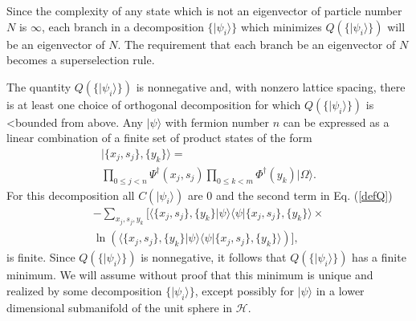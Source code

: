 \documentclass[twocolumn,amsmath,amssymb]{revtex4-1}
\begin{document}
Since the complexity of any state which is not an eigenvector of particle number $N$
is $\infty$, each branch in a decomposition $\{|\psi_i \rangle \}$ which minimizes
$Q( \{|\psi_i \rangle \})$ will be an eigenvector of $N$.
The requirement that each branch be an eigenvector of $N$
becomes a superselection rule.


The quantity $Q( \{|\psi_i \rangle \})$ is nonnegative and, with
nonzero lattice spacing, there is at least
one choice of orthogonal decomposition for which
$Q( \{|\psi_i \rangle \})$ is
<bounded from above.
Any $|\psi \rangle $ with fermion number $n$ can be expressed as a linear
combination of a finite set of product states of the form
\begin{multline}
\label{particlesatpoints}
|\{x_j, s_j\}, \{y_k\} \rangle  = \\ \prod_{0 \le j < n} \Psi^{\dagger}( x_j, s_j) \prod_{0 \le k < m} \Phi^{\dagger}( y_k) |\Omega \rangle .
\end{multline}
For this decomposition all $C( |\psi_i \rangle )$ are 0
and the second term in Eq. (\ref{defQ})
\begin{multline}
\label{pointstates1}
-\sum_{x_j,s_j, y_k} [ \langle  \{x_j,s_j\}, \{y_k\}|\psi \rangle  \langle \psi|\{x_j,s_j\},\{ y_k\} \rangle  \times \\
\ln ( \langle  \{x_j,s_j\}, \{y_k\}|\psi \rangle  \langle \psi|\{x_j,s_j\}, \{y_k\} \rangle )],
\end{multline}
is finite.
Since $Q( \{|\psi_i \rangle \})$ is nonnegative, it follows that $Q( \{|\psi_i \rangle \})$ has 
a finite minimum.
We will assume without proof that
this minimum is unique and realized by some
decomposition $\{ |\psi_i \rangle  \}$, except possibly for  $|\psi \rangle $ in a lower
dimensional submanifold of the unit sphere in $\mathcal{H}$.
\end{document}
